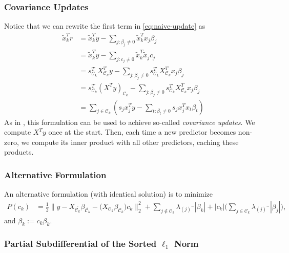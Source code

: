 \subsubsection{Covariance Updates}

Notice that we can rewrite the first term in \eqref{eq:naive-update} as
\begin{equation}
  \begin{aligned}
    \tilde x_k^T r & = \tilde x_k^T y - \sum_{j : \beta_j \neq 0} \tilde x_k^T x_j \beta_j                                                                    \\
                   & = \tilde x_k^T y - \sum_{j : c_j \neq 0} \tilde x_k^T \tilde x_j c_j                                                                     \\
                   & = s_{\mathcal{C}_k}^T X_{\mathcal{C}_k}^T y - \sum_{j : \beta_j \neq 0} s_{\mathcal{C}_k}^T X_{\mathcal{C}_k}^T x_j \beta_j              \\
                   & = s_{\mathcal{C}_k}^T \left(X^T y\right)_{\mathcal{C}_k} - \sum_{j : \beta_j \neq 0} s_{\mathcal{C}_k}^T X_{\mathcal{C}_k}^T x_j \beta_j \\
                   & = \sum_{j \in \mathcal{C}_k}\left( s_j x_j^Ty - \sum_{t : \beta_t \neq 0} s_j x_j^T x_t \beta_t \right)
  \end{aligned}
\end{equation}
As in \textcite{friedman2010}, this formulation can be used to achieve so-called \emph{covariance updates}.
We compute \(X^T y\) once at the start.
Then, each time a new predictor becomes non-zero, we compute its inner product with all other predictors, caching these products.

\subsubsection{Alternative Formulation}

An alternative formulation (with identical solution) is to minimize
\[
  \begin{aligned}
    P(c_k) & = \frac{1}{2} \lVert y - X_{\bar{\mathcal{C}_k}} \beta_{\bar{\mathcal{C}_k}} - \big(X_{\mathcal{C}_k} \beta_{\mathcal{C}_k}\big)c_k  \rVert_2^2 + \sum_{j \notin {\mathcal{C}_k}} \lambda_{(j)^-}|\beta_k| + |c_k|\bigg(\sum_{j \in {\mathcal{C}_k}} \lambda_{(j)^- }|\beta_j|\bigg),
  \end{aligned}
\]
and \(\beta_k := c_k\beta_k\).

\subsubsection{Partial Subdifferential of the Sorted \(\ell_1\) Norm}

